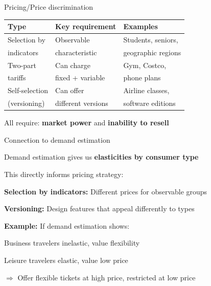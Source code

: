 \documentclass[notes,11pt, aspectratio=169]{beamer}
\newenvironment{wideitemize}{\itemize\addtolength{\itemsep}{10pt}}{\enditemize}
\begin{document}
\begin{frame}{Pricing/Price discrimination}
	\begin{center}
	\begin{tabular}{|l|l|l|}
		\hline
		\textbf{Type} & \textbf{Key requirement} & \textbf{Examples} \\
		\hline
		Selection by & Observable & Students, seniors, \\
		indicators & characteristic & geographic regions \\
		\hline
		Two-part & Can charge & Gym, Costco, \\
		tariffs & fixed + variable & phone plans \\
		\hline
		Self-selection & Can offer & Airline classes, \\
		(versioning) & different versions & software editions \\
		\hline
	\end{tabular}
	\end{center}
	\vspace{10pt}
	\begin{wideitemize}
		\item All require: \textbf{market power} and \textbf{inability to resell}
	\end{wideitemize}
\end{frame}

\begin{frame}{Connection to demand estimation}
	\begin{wideitemize}
		\item Demand estimation gives us \textbf{elasticities by consumer type}
		\item This directly informs pricing strategy:
		\begin{wideitemize}
			\vspace{5pt}
			\item \textbf{Selection by indicators:} Different prices for observable groups
			\item \textbf{Versioning:} Design features that appeal differently to types
		\end{wideitemize}
		\item \textbf{Example:} If demand estimation shows:
		\begin{wideitemize}
			\vspace{5pt}
			\item Business travelers inelastic, value flexibility
			\item Leisure travelers elastic, value low price
		\end{wideitemize}
		\item $\Rightarrow$ Offer flexible tickets at high price, restricted at low price
	\end{wideitemize}
\end{frame}
\end{document}
